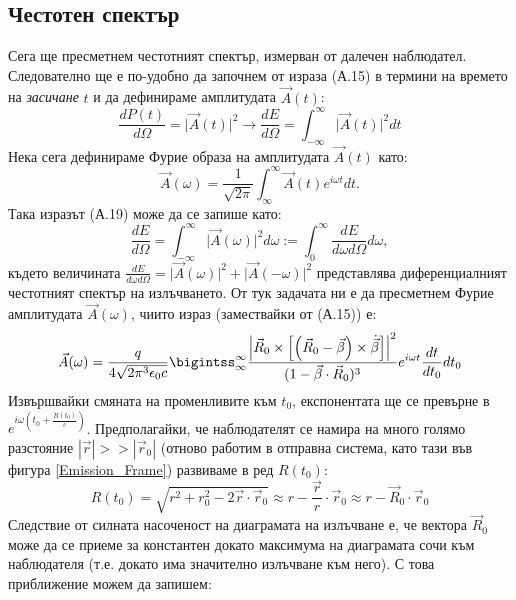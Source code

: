 \begin{appendices}
\subsection{Честотен спектър}
Сега ще пресметнем честотният спектър, измерван от далечен наблюдател. Следователно ще е по-удобно да започнем от израза (А.15) в термини на времето на \emph{засичане} $t$ и да дефинираме амплитудата $\vec{A}(t)$:
\begin{equation}
	\frac{dP(t)}{d\Omega} = \big|\vec{A}(t)\big|^2 \rightarrow \frac{dE}{d\Omega} = \int_{-\infty}^\infty \big|\vec{A}(t)\big|^2 dt
\end{equation}
Нека сега дефинираме Фурие образа на амплитудата $\vec{A}(t)$ като:
\begin{equation}
	\vec{A}(\omega) = \frac{1}{\sqrt{2\pi}}\int_\infty^\infty \vec{A}(t)e^{i\omega t}dt.
\end{equation}
Така изразът (А.19) може да се запише като:
\begin{equation}
	\frac{dE}{d\Omega} = \int_{-\infty}^\infty \big|\vec{A}(\omega)\big|^2 d\omega := \int_{0}^\infty \frac{dE}{d\omega d\Omega} d\omega,
\end{equation}
където величината $\frac{dE}{d\omega d\Omega} = \big|\vec{A}(\omega)\big|^2 + \big|\vec{A}(-\omega)\big|^2$ представлява диференциалният честотният спектър на излъчването. От тук задачата ни е да пресметнем Фурие амплитудата $\vec{A}(\omega)$, чиито израз (замествайки от (А.15)) е:
\begin{equation}
	\vec{A}(\omega) = \frac{q}{4\sqrt{2\pi^3\epsilon_0 c}}\bigintss_\infty^\infty\frac{\left\vert\vec{R}_0 \times \left[\left(\vec{R}_0 - \vec{\beta}\right)\times\dot{\vec{\beta}}\right]\right\vert^2}{(1 - \vec{\beta}\cdot\vec{R}_0)^3}e^{i\omega t}\frac{dt}{dt_0}dt_0
\end{equation}
Извършвайки смяната на променливите към $t_0$, експонентата ще се превърне в $e^{i\omega\left(t_0 + \frac{R(t_0)}{c}\right)}$. Предполагайки, че наблюдателят се намира на много голямо разстояние $|\vec{r}| >> |\vec{r}_0|$ (отново работим в отправна система, като тази във фигура \ref{Emission_Frame}) развиваме в ред $R(t_0)$:
\begin{equation}
	R(t_0) = \sqrt{r^2 + r_0^2 - 2\vec{r}\cdot\vec{r}_0}\approx r - \frac{\vec{r}}{r}\cdot\vec{r}_0 \approx r - \vec{R}_0\cdot\vec{r}_0
\end{equation}
Следствие от силната насоченост на диаграмата на излъчване е, че вектора $\vec{R}_0$ може да се приеме за константен докато максимума на диаграмата сочи към наблюдателя (т.е. докато има значително излъчване към него). С това приближение можем да запишем:

\end{appendices}
